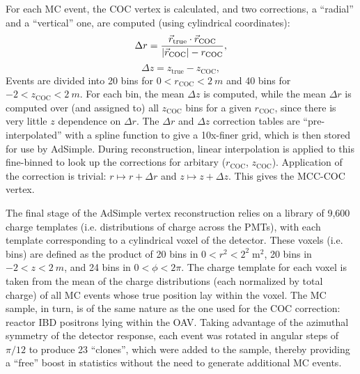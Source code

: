 \documentclass[../thesis.tex]{subfiles}
\begin{document}
For each MC event, the COC vertex is calculated, and two corrections, a ``radial'' and a ``vertical'' one, are computed (using cylindrical coordinates):
\begin{equation*}
  \Delta r = \frac{\vec{r}_{\mathrm{true}} \cdot \vec{r}_{\mathrm{COC}}}{\lvert \vec{r}_{\mathrm{COC}}\rvert - r_{\mathrm{COC}}},
\end{equation*}
\begin{equation*}
  \Delta z = z_{\mathrm{true}} - z_{\mathrm{COC}},
\end{equation*}
Events are divided into 20 bins for $0 < r_{\mathrm{COC}} < \SI{2}{m}$ and 40 bins for $-2 < z_{\mathrm{COC}} < \SI{2}{m}$. For each bin, the mean $\Delta z$ is computed, while the mean $\Delta r$ is computed over (and assigned to) all $z{_\mathrm{COC}}$ bins for a given $r_{\mathrm{COC}}$, since there is very little $z$ dependence on $\Delta r$. The $\Delta r$ and $\Delta z$ correction tables are ``pre-interpolated'' with a spline function to give a 10x-finer grid, which is then stored for use by AdSimple. During reconstruction, linear interpolation is applied to this fine-binned to look up the corrections for arbitary ($r_{\mathrm{COC}}$, $z_{\mathrm{COC}}$). Application of the correction is trivial: $r \mapsto r + \Delta r$ and $z \mapsto z + \Delta z$. This gives the MCC-COC vertex.

The final stage of the AdSimple vertex reconstruction relies on a library of 9,600 charge templates (i.e. distributions of charge across the PMTs), with each template corresponding to a cylindrical voxel of the detector. These voxels (i.e. bins) are defined as the product of 20 bins in $0 < r^2 < 2^2\;\mathrm{m}^2$, 20 bins in $-2 < z < \SI{2}{m}$, and 24 bins in $0 < \phi < 2\pi$. The charge template for each voxel is taken from the mean of the charge distributions (each normalized by total charge) of all MC events whose true position lay within the voxel. The MC sample, in turn, is of the same nature as the one used for the COC correction: reactor IBD positrons lying within the OAV. Taking advantage of the azimuthal symmetry of the detector response, each event was rotated in angular steps of $\pi/12$ to produce 23 ``clones'', which were added to the sample, thereby providing a ``free'' boost in statistics without the need to generate additional MC events.

\newcommand\Niobs{N_i^{\mathrm{obs}}}
\newcommand\Niexp{N_i^{\mathrm{exp}}}
\end{document}
